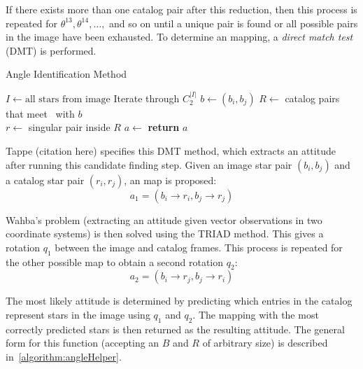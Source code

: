 If there exists more than one catalog pair after this reduction, then this process is repeated for
$\theta^{13}, \theta^{14}, \dots,$ and so on until a unique pair is found or all possible pairs in the image
have been exhausted.
To determine an mapping, a \textit{direct match test} (DMT) is performed.

\begin{algorithm}
    \caption{Angle Identification Method} \label{algorithm:angleIdentification}
    \begin{algorithmic}[1]
        \State $I \gets \text{all stars} \text{ from image}$
         \Comment Iterate through $C^{|I|}_2$
        \State $b \gets (b_i, b_j)$
        \State $R \gets $ catalog pairs that meet~ with $b$
        \\
        \State $r \gets $ singular pair inside $R$
        \State $a \gets $ 
        \State \textbf{return} $a$
        \EndIf
        \EndFor
        \EndFor
        \EndProcedure
    \end{algorithmic}
\end{algorithm}

Tappe (citation here) specifies this DMT method, which extracts an attitude after running this candidate finding step.
Given an image star pair $(b_i, b_j)$ and a catalog star pair $(r_i, r_j)$, an map is proposed:
\begin{equation}
    a_1 = (b_i \rightarrow r_i, b_j \rightarrow r_j)
\end{equation}

Wahba's problem (extracting an attitude given vector observations in two coordinate systems) is then solved using the
TRIAD method.
This gives a rotation $q_1$ between the image and catalog frames.
This process is repeated for the other possible map to obtain a second rotation $q_2$:
\begin{equation}
    a_2 = (b_i \rightarrow r_j, b_j \rightarrow r_i)
\end{equation}

The most likely attitude is determined by predicting which entries in the catalog represent stars in the image using
$q_1$ and $q_2$.
The mapping with the most correctly predicted stars is then returned as the resulting attitude.
The general form for this function (accepting an $B$ and $R$ of arbitrary size) is described
in~\autoref{algorithm:angleHelper}.

